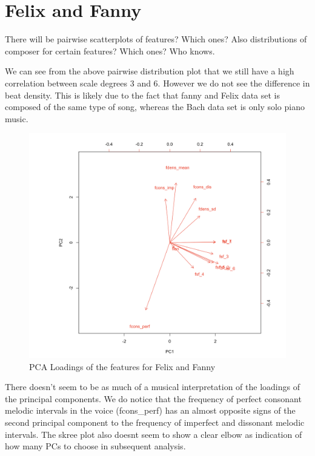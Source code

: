 \documentclass[12pt,twoside]{reedthesis}
\theoremstyle{definition}
\theoremstyle{definition}
\theoremstyle{definition}
\theoremstyle{remark}
\begin{document}
\section{Felix and Fanny}\label{felix-and-fanny}

There will be pairwise scatterplots of features? Which ones? Also
distributions of composer for certain features? Which ones? Who knows.

We can see from the above pairwise distribution plot that we still have
a high correlation between scale degrees 3 and 6. However we do not see
the difference in beat density. This is likely due to the fact that
fanny and Felix data set is composed of the same type of song, whereas
the Bach data set is only solo piano music.
\begin{figure}[h]
\centering
\includegraphics[scale = .3]{images/ploadff.png}
\caption{PCA Loadings of the features for Felix and Fanny}
\label{subd}
\end{figure}
There doesn't seem to be as much of a musical interpretation of the
loadings of the principal components. We do notice that the frequency of
perfect consonant melodic intervals in the voice (fcons\_perf) has an
almost opposite signs of the second principal component to the frequency
of imperfect and dissonant melodic intervals. The skree plot also doesnt
seem to show a clear elbow as indication of how many PCs to choose in
subsequent analysis.
\end{document}
